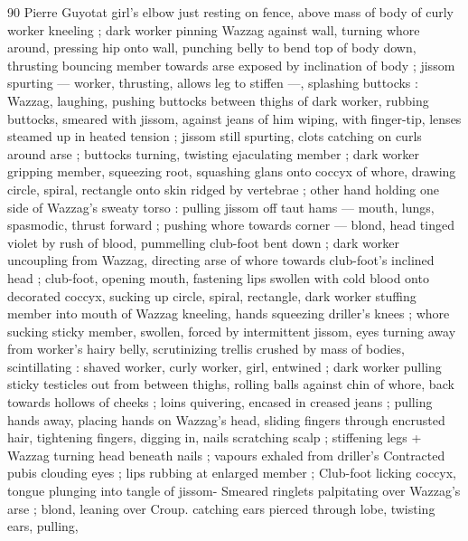 90 Pierre Guyotat
girl's elbow just resting on fence, above mass of body of curly
worker kneeling ; dark worker pinning Wazzag against wall, turning
whore around, pressing hip onto wall, punching belly to bend top of
body down, thrusting bouncing member towards arse exposed by
inclination of body ; jissom spurting — worker, thrusting, allows leg
to stiffen —, splashing buttocks : Wazzag, laughing, pushing
buttocks between thighs of dark worker, rubbing buttocks, smeared
with jissom, against jeans of him wiping, with finger-tip, lenses
steamed up in heated tension ; jissom still spurting, clots catching on
curls around arse ; buttocks turning, twisting ejaculating member ;
dark worker gripping member, squeezing root, squashing glans onto
coccyx of whore, drawing circle, spiral, rectangle onto skin ridged by
vertebrae ; other hand holding one side of Wazzag's sweaty torso :
pulling jissom off taut hams — mouth, lungs, spasmodic, thrust
forward ; pushing whore towards corner — blond, head tinged violet
by rush of blood, pummelling club-foot bent down ; dark worker
uncoupling from Wazzag, directing arse of whore towards club-foot's
inclined head ; club-foot, opening mouth, fastening lips swollen with
cold blood onto decorated coccyx, sucking up circle, spiral,
rectangle, dark worker stuffing member into mouth of Wazzag
kneeling, hands squeezing driller's knees ; whore sucking sticky
member, swollen, forced by intermittent jissom, eyes turning away
from worker's hairy belly, scrutinizing trellis crushed by mass of
bodies, scintillating : shaved worker, curly worker, girl, entwined ;
dark worker pulling sticky testicles out from between thighs, rolling
balls against chin of whore, back towards hollows of cheeks ; loins
quivering, encased in creased jeans ; pulling hands away, placing
hands on Wazzag’s head, sliding fingers through encrusted hair,
tightening fingers, digging in, nails scratching scalp ; stiffening legs
+ Wazzag turning head beneath nails ; vapours exhaled from driller's
Contracted pubis clouding eyes ; lips rubbing at enlarged member ;
Club-foot licking coccyx, tongue plunging into tangle of jissom-
Smeared ringlets palpitating over Wazzag's arse ; blond, leaning over
Croup. catching ears pierced through lobe, twisting ears, pulling,

